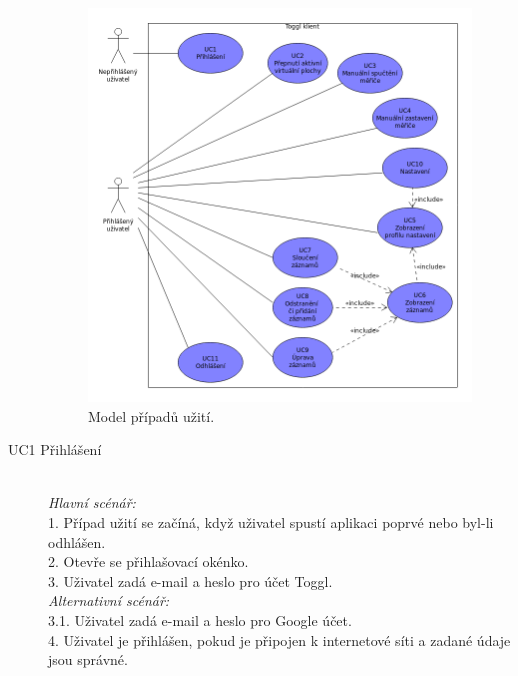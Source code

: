 \documentclass[thesis=B,czech]{FITthesis}[2012/06/26]
\begin{document}
\begin{description}
	
	 \begin{figure}[h]\centering
		\includegraphics[width=1\textwidth]{usecase4.png}
		\caption[Model případů užití.]{Model případů užití.}\label{fig:usecases}
	\end{figure}
	
	
	\item[UC1 Přihlášení] \hspace*{\fill} \\
	\textit{Hlavní scénář:} %
	\\
	1. Případ užití se začíná, když uživatel spustí aplikaci poprvé nebo byl-li odhlášen.\\
	2. Otevře se přihlašovací okénko.\\
	3. Uživatel zadá e-mail a heslo pro účet Toggl. \\
	\parindent=3cm \textit{Alternativní scénář:} \\
	3.1. Uživatel zadá e-mail a heslo pro Google účet. \\
	4. Uživatel je přihlášen, pokud je připojen k internetové síti a zadané údaje jsou správné. 
	

\end{description}
\end{document}
